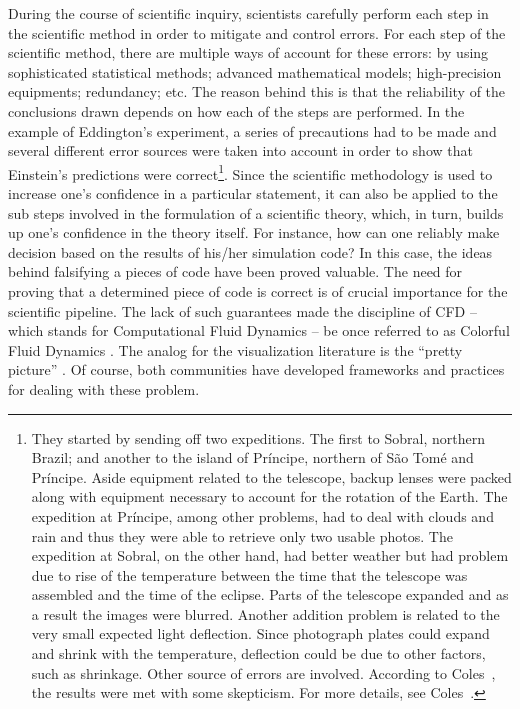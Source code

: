 During the course of scientific inquiry, scientists carefully perform each step in the scientific method in order to mitigate and control errors. For each step of the scientific method, there are multiple ways of account for these errors: by using sophisticated statistical methods; advanced mathematical models; high-precision equipments; redundancy; etc.  The reason behind this is that the reliability of the conclusions drawn depends on how each of the steps are performed. In the example of Eddington's experiment, a series of precautions had to be made and several different error sources were taken into account in order to show that Einstein's predictions were correct\footnote{They started by sending off two expeditions. The first to Sobral, northern Brazil; and another to the island of Pr\'incipe, northern of S\~ao Tom\'e and Pr\'incipe. Aside equipment related to the telescope, backup lenses were packed along with equipment necessary to account for the rotation of the Earth. The expedition at Pr\'incipe, among other problems, had to deal with clouds and rain and thus they were able to retrieve only two usable photos. The expedition at Sobral, on the other hand, had better weather but had problem due to rise of the temperature between the time that the telescope was assembled and the time of the eclipse. Parts of the telescope expanded and as a result the images were blurred. Another addition problem is related to the very small expected light deflection. Since photograph plates could expand and shrink with the temperature, deflection could be due to other factors, such as shrinkage. Other source of errors are involved. According to Coles~\cite{coles2001einstein}, the results were met with some skepticism. For more details, see Coles~\cite{coles2001einstein}.}. 
%
Since the scientific methodology is used to increase one's confidence in a particular statement, it can also be applied to the sub steps involved in the formulation of a scientific theory, which, in turn, builds up one's confidence in the theory itself. For instance, how can one reliably make decision based on the results of his/her simulation code? In this case, the ideas behind falsifying a pieces of code have been proved valuable. The need for proving that a determined piece of code is correct is of crucial importance for the scientific pipeline. The lack of such guarantees made the discipline of CFD -- which stands for Computational Fluid Dynamics -- be once referred to as Colorful Fluid Dynamics \cite{meroney2004wind}. The analog for the visualization literature is the  ``pretty picture'' \cite{Globus:1994:FWS:182452.182465}. Of course, both communities have developed frameworks and practices for dealing with these problem.

